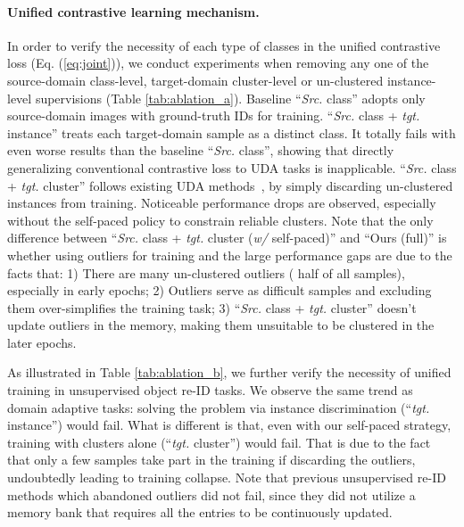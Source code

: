 \documentclass{article}
\begin{document}
\paragraph{Unified contrastive learning mechanism.}
In order to verify the necessity of each type of classes in the unified contrastive loss (Eq. (\ref{eq:joint})),
we conduct experiments when removing any one of the source-domain class-level, target-domain cluster-level or un-clustered instance-level supervisions (Table \ref{tab:ablation_a}).
Baseline ``\textit{Src.} class'' adopts only source-domain images with ground-truth IDs for training.
``\textit{Src.} class + \textit{tgt.} instance'' 
treats each target-domain sample as a distinct class.
It totally fails with even worse results than the baseline ``\textit{Src.} class'', 
showing that directly generalizing conventional contrastive loss to UDA tasks is inapplicable.
``\textit{Src.} class + \textit{tgt.} cluster'' follows existing UDA methods~\cite{ge2020mutual,yang2019selfsimilarity,zhang2019self,ge2020structured}, by simply discarding un-clustered instances from training.
Noticeable performance drops are observed,
especially without the self-paced policy to constrain reliable clusters.
Note that the only difference between ``\textit{Src.} class + \textit{tgt.} cluster (\textit{w/} self-paced)'' and ``Ours (full)'' is whether using outliers for training and the large performance gaps are due to the facts that:
1) There are many un-clustered outliers ( half of all samples), especially in early epochs;
2) Outliers serve as difficult samples and excluding them over-simplifies the training task;
3) ``\textit{Src.} class + \textit{tgt.} cluster'' doesn’t update outliers in the memory, making them unsuitable to be clustered in the later epochs.

As illustrated in Table \ref{tab:ablation_b}, we further verify the necessity of unified training in unsupervised object re-ID tasks. We observe the same trend as domain adaptive tasks: solving the problem via instance discrimination (``\textit{tgt.} instance'') would fail. What is different is that, even with our self-paced strategy, training with clusters alone (``\textit{tgt.} cluster'') would fail. That is due to the fact that only a few samples take part in the training if discarding the outliers, undoubtedly leading to training collapse. 
Note that previous unsupervised re-ID methods \cite{lin2019aBottom,zeng2020hierarchical} which abandoned outliers did not fail, since they did not utilize a memory bank that requires all the entries to be continuously updated.
\end{document}

